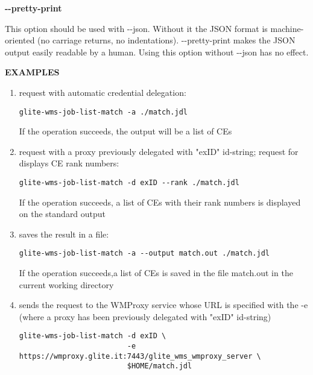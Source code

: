 \textbf{-{}-pretty-print}

This option should be used with -{}-json. Without it the JSON format is 
machine-oriented (no carriage returns, no indentations). -{}-pretty-print makes 
the JSON output easily readable by a human. Using this option without -{}-json has no effect.





\medskip
\textbf{EXAMPLES}
\smallskip


\begin{enumerate}


\item  request with automatic credential delegation:

\begin{verbatim}
glite-wms-job-list-match -a ./match.jdl
\end{verbatim}

If the operation succeeds, the output will be a list of CEs


\item  request with a proxy previously delegated with "exID" id-string; request for displays CE rank numbers:
\begin{verbatim}
glite-wms-job-list-match -d exID --rank ./match.jdl
\end{verbatim}

If the operation succeeds, a list of CEs with their rank numbers is displayed on the standard output


\item  saves the result in a file:
\begin{verbatim}
glite-wms-job-list-match -a --output match.out ./match.jdl
\end{verbatim}

If the operation succeeds,a list of CEs is saved in the file match.out in the current working directory


\item  sends the request to the WMProxy service whose URL is specified with the -e (where a proxy has been previously delegated with "exID" id-string)

\begin{verbatim}
glite-wms-job-list-match -d exID \
                         -e https://wmproxy.glite.it:7443/glite_wms_wmproxy_server \
                         $HOME/match.jdl
\end{verbatim}

\end{enumerate}


